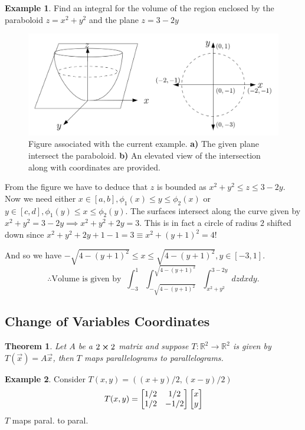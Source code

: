 \documentclass[
	12pt,
	]{article}
\newcommand{\R}{\mathbb{R}}
\theoremstyle{custom}
\newtheorem{theorem}{Theorem}[section]
\theoremstyle{custom}
\theoremstyle{custom}
\theoremstyle{custom}
\theoremstyle{custom}
\theoremstyle{definition}
\newtheorem{example}{Example}[section]
\theoremstyle{example}
\theoremstyle{note}
\theoremstyle{remark}
\theoremstyle{example}
\newcounter{theo}[section]\setcounter{theo}{0}
\numberwithin{equation}{subsection}
\begin{document}
  			\begin{example}
  				Find an integral for the volume of the region enclosed by the paraboloid \newline  $z=x^{2} + y^{2}$ and the plane $z= 3- 2y$
  				\begin{figure}[H]
  					\centering
  					\includegraphics[width=0.75\linewidth]{MATH314_Notes_Triple_Integral_Example1_Figure.png}
  					\captionsetup{margin=1cm, justification=raggedright}\caption{Figure associated with the current example. \textbf{a)} The given plane intersect the paraboloid. \textbf{b)} An elevated view of the intersection along with coordinates are provided.}
  				\end{figure}
  				\noindent From the figure we have to deduce that $z$ is bounded as $x^{2}+y^{2} \le z \le 3-2y$. Now we need either $x\in [a,b] , \phi_{1}(x)\le y \le \phi_{2}(x)$ or $y \in [c,d] , \phi_{1}(y) \le x \le \phi_{2}(y)$. 
  				The surfaces intersect along the curve given by $x^{2}+y^{2} = 3-2y \implies x^{2} + y^{2} + 2y =3. $ This is in fact a circle of radius $2$ shifted down since $x^{2} + y^{2} + 2y +1 -1 = 3 \equiv x^{2} + (y+1)^{2} =4 ! $
  				
  				\noindent And so we have $-\sqrt{4-(y+1)^{2}} \le x \le \sqrt{4-(y+1)^{2}} , y\in [-3,1]$.
  				$$ \therefore \text{Volume is given by } \ \int_{-3}^{1} \int_{-\sqrt{4-(y+1)^{2}}}^{\sqrt{4-(y+1)^{2}}}\int_{x^{2}+y^{2}}^{3-2y} dzdxdy.$$
  			\end{example}
  			
  			\subsection{Change of Variables Coordinates}
  			
  			\begin{theorem}
  				Let $A$ be a $2\cross 2$ matrix and suppose $T: \R^{2} \to \R^{2}$ is given by $T(\vec{x}) = A \vec{x}$, then $T$ maps parallelograms to parallelograms.
  			\end{theorem}
  			
  			\begin{example}
  				Consider $T(x,y) = ((x+y)/2 , (x-y)/2)$
  				$$ T(x,y) = 
  				\begin{bmatrix}
  					1/2 & 1/2 \\
  					1/2 & -1/2 
  				\end{bmatrix}
  				\begin{bmatrix}
  					\vphantom{1/2}	x \\
  					\vphantom{1/2}y
  				\end{bmatrix}$$
  				$T$ maps paral. to paral.
  			\end{example}
  			
\end{document}
